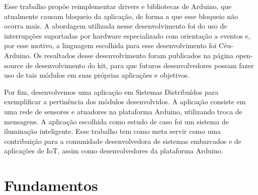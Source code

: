\documentclass[11pt]{article}
\begin{document}
\par Esse trabalho propõe reimplementar drivers e bibliotecas de Arduino, que atualmente causam
bloqueio da aplicação, de forma a que esse bloqueio não ocorra mais. A abordagem utilizada nesse
desenvolvimento foi do uso de interrupções suportadas por hardware especializado com orientação a
eventos e, por esse motivo, a linguagem escolhida para esse desenvolvimento foi Céu-Arduino. Os
resultados desse desenvolvimento foram publicados na página open-source de desenvolvimento do
kit, para que futuros desenvolvedores possam fazer uso de tais módulos em suas próprias aplicações
e objetivos.
\par Por fim, desenvolvemos uma aplicação em Sistemas Distribuídos para exemplificar a pertinência
dos módulos desenvolvidos. A aplicação consiste em uma rede de sensores e atuadores na
plataforma Arduino, utilizando troca de mensagens. A aplicação escolhida como estudo de caso foi um sistema de iluminação inteligente. Esse trabalho tem como meta servir como uma contribuição
para a comunidade desenvolvedora de sistemas embarcados e de aplicações de IoT, assim como
desenvolvedores da plataforma Arduino.
\section{Fundamentos}
\end{document}
